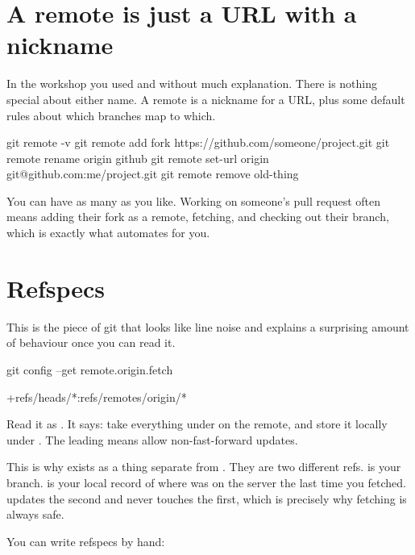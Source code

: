 \documentclass[11pt]{article}
\begin{document}
\maketitlepage

\section{A remote is just a URL with a nickname}

In the workshop you used  and  without much explanation.
There is nothing special about either name. A remote is a nickname for a URL, plus
some default rules about which branches map to which.

\begin{shell}
git remote -v
git remote add fork https://github.com/someone/project.git
git remote rename origin github
git remote set-url origin git@github.com:me/project.git
git remote remove old-thing
\end{shell}

You can have as many as you like. Working on someone's pull request often means
adding their fork as a remote, fetching, and checking out their branch, which is
exactly what  automates for you.

\section{Refspecs}

This is the piece of git that looks like line noise and explains a surprising amount
of behaviour once you can read it.

\begin{shell}
git config --get remote.origin.fetch
\end{shell}

\begin{terminal}
+refs/heads/*:refs/remotes/origin/*
\end{terminal}

Read it as . It says: take everything under
 on the remote, and store it locally under
. The leading \co{+} means allow non-fast-forward updates.

This is why  exists as a thing separate from . They are two
different refs.  is your branch.  is your local record of
where  was on the server the last time you fetched.  updates
the second and never touches the first, which is precisely why fetching is always
safe.

You can write refspecs by hand:
\end{document}
